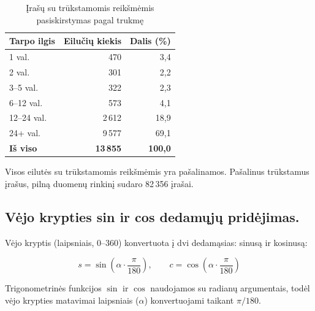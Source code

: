 \documentclass[]{VUMIFTemplateClass}
\begin{document}
    \begin{table}[H]
        \centering
        \caption{Įrašų su trūkstamomis reikšmėmis pasiskirstymas pagal trukmę}
        \small
        \setlength{\tabcolsep}{8pt}
        \begin{tabular}{|l|r|r|}
            \hline
            \textbf{Tarpo ilgis} & \textbf{Eilučių kiekis} & \textbf{Dalis (\%)} \\
            \hline
            1 val.               & 470                     & 3,4                 \\
            2 val.               & 301                     & 2,2                 \\
            3--5 val.            & 322                     & 2,3                 \\
            6--12 val.           & 573                     & 4,1                 \\
            12--24 val.          & 2\,612                  & 18,9                \\
            24+ val.             & 9\,577                  & 69,1                \\
            \hline
            \textbf{Iš viso}     & \textbf{13\,855}        & \textbf{100,0}      \\
            \hline
        \end{tabular}
        \label{tab:gap_distribution}
    \end{table}
    Visos eilutės su trūkstamomis reikšmėmis yra pašalinamos.
    Pašalinus trūkstamus įrašus, pilną duomenų rinkinį sudaro 82\,356 įrašai.

    \subsection{Vėjo krypties sin ir cos dedamųjų pridėjimas.}

    Vėjo kryptis (laipsniais, 0--360\textdegree) konvertuota į dvi dedamąsias: sinusą ir kosinusą:

    \begin{equation}
        s = \sin\!\left(\alpha \cdot \frac{\pi}{180}\right), \qquad
        c = \cos\!\left(\alpha \cdot \frac{\pi}{180}\right)
        \label{eq:windsincos}
    \end{equation}

    Trigonometrinės funkcijos $\sin$ ir $\cos$ naudojamos su radianų argumentais, todėl vėjo krypties matavimai laipsniais ($\alpha$) konvertuojami taikant $\pi/180$.
\end{document}
